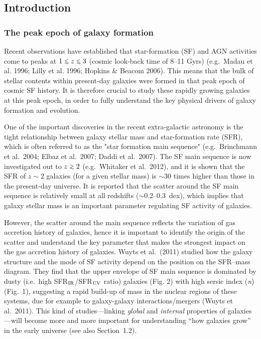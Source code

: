 \subsection{Introduction}
\subsubsection{The peak epoch of galaxy formation}

Recent observations have established that star-formation (SF) and AGN
activities come to peaks at $1\lsim z\lsim 3$ (cosmic look-back time of 8--11 Gyrs)
(e.g.\ Madau et al. 1996; Lilly et al. 1996; Hopkins \& Beacom 2006).
This means that the bulk of stellar contents within
present-day galaxies were formed in that peak epoch of cosmic SF
history. It is therefore crucial to study these rapidly growing
galaxies at this peak epoch, in order to fully
understand the key physical drivers of galaxy formation and evolution.

One of the important discoveries in the recent extra-galactic
astronomy is the tight relationship between galaxy stellar mass and
star-formation rate (SFR), which is often referred to as the "star
formation main sequence" (e.g.\ Brinchmann et al.\ 2004; Elbaz et al.\
2007; Daddi et al.\ 2007). The SF main sequence is now investigated out
to $z\gsim 2$ (e.g.\ Whitaker et al.\ 2012), and it is shown that the
SFR of $z\sim 2$ galaxies (for a given stellar mass) is $\sim$30 times
higher than those in the present-day universe. It is reported that the
scatter around the SF main sequence is relatively small at all redshifts
($\sim$0.2--0.3~dex), which implies that galaxy stellar mass is an
important parameter regulating SF activity of galaxies.

However, the scatter around the main sequence reflects the variation
of gas accretion history of galaxies, hence it is important to
identify the origin of the scatter and understand the key parameter
that makes the strongest impact on the gas accretion history of
galaxies. Wuyts et al.\ (2011) studied how the galaxy structure and the
mode of SF activity depend on the position on the SFR--mass diagram.
They find that the upper envelope of SF main sequence is dominated by
dusty (i.e.\ high SFR$_{\rm IR}$/SFR$_{\rm UV}$ ratio) galaxies (Fig. 2)
with high sersic index ({\it n}) (Fig.\ 1), suggesting a rapid build-up
of mass in the nuclear regions of these systems, due for example to
galaxy-galaxy interactions/mergers (Wuyts et al.\ 2011). 
This kind of studies---linking {\it global} and {\it internal} properties
of galaxies---will become more and more important for understanding 
``how galaxies grow'' in the early universe (see also Section~1.2).

